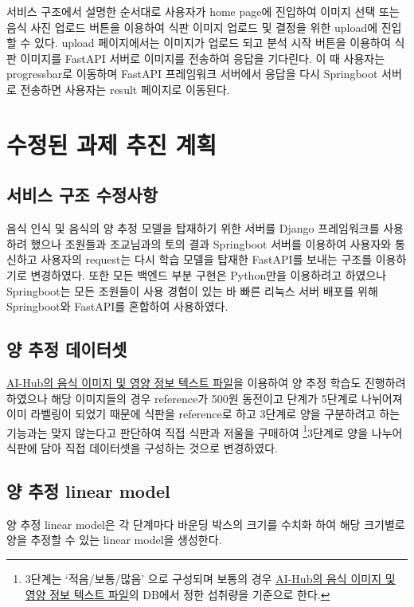 \documentclass[10pt, a4paper]{article}
\theoremstyle{definition}
\begin{document}
    서비스 구조에서 설명한 순서대로 사용자가 home page에 진입하여 이미지 선택 또는 음식 사진 업로드 버튼을 이용하여 식판 이미지 업로드 및 결정을 위한 upload에 진입할 수 있다. upload 페이지에서는 이미지가 업로드 되고 분석 시작 버튼을 이용하여 식판 이미지를 FastAPI 서버로 이미지를 전송하여 응답을 기다린다. 이 때 사용자는 progressbar로 이동하며 FastAPI 프레임워크 서버에서 응답을 다시 Springboot 서버로 전송하면 사용자는 result 페이지로 이동된다.


    \section{수정된 과제 추진 계획}\label{sec:수정 과제 계획}

    \subsection{서비스 구조 수정사항}\label{subsec:서비스 구조 수정사항}
    음식 인식 및 음식의 양 추정 모델을 탑재하기 위한 서버를 Django 프레임워크를 사용하려 했으나 조원들과 조교님과의 토의 결과 Springboot 서버를 이용하여 사용자와 통신하고 사용자의 request는 다시 학습 모델을 탑재한 FastAPI를 보내는 구조를 이용하기로 변경하였다. 또한 모든 백엔드 부분 구현은 Python만을 이용하려고 하였으나 Springboot는 모든 조원들이 사용 경험이 있는 바 빠른 리눅스 서버 배포를 위해 Springboot와 FastAPI를 혼합하여 사용하였다.

    \subsection{양 추정 데이터셋}\label{subsec:양 추정 데이터셋}
    \textcolor{blue}{\underline{\href{https://www.aihub.or.kr/aihubdata/data/view.do?currMenu=115&topMenu=100&aihubDataSe=data&dataSetSn=74}{AI-Hub의 음식 이미지 및 영양 정보 텍스트 파일}}}을 이용하여 양 추정 학습도 진행하려 하였으나 해당 이미지들의 경우 reference가 500원 동전이고 단계가 5단계로 나뉘어져 이미 라벨링이 되었기 때문에 식판을 reference로 하고 3단계로 양을 구분하려고 하는 기능과는 맞지 않는다고 판단하여 직접 식판과 저울을 구매하여 \footnote{3단계는 `적음/보통/많음' 으로 구성되며 보통의 경우  \textcolor{blue}{\underline{\href{https://www.aihub.or.kr/aihubdata/data/view.do?currMenu=115&topMenu=100&aihubDataSe=data&dataSetSn=74}{AI-Hub의 음식 이미지 및 영양 정보 텍스트 파일}}}의 DB에서 정한 섭취량을 기준으로 한다.}{3단계}로 양을 나누어 식판에 담아 직접 데이터셋을 구성하는 것으로 변경하였다.

    \subsection{양 추정 linear model}\label{subsec:양 추정 linear model}
    양 추정 linear model은 각 단계마다 바운딩 박스의 크기를 수치화 하여 해당 크기별로 양을 추정할 수 있는 linear model을 생성한다.
\end{document}
